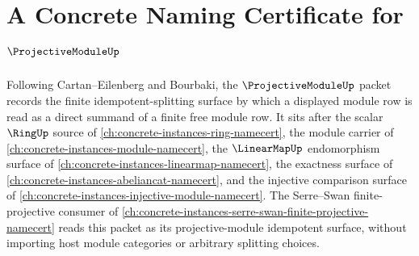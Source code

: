 \chapter{A Concrete Naming Certificate for $\ProjectiveModuleUp$}
\label{ch:concrete-instances-projective-module-namecert}

Following Cartan--Eilenberg and Bourbaki, the $\ProjectiveModuleUp$ packet records the finite idempotent-splitting surface by which a displayed module row is read as a direct summand of a finite free module row. It sits after the scalar $\RingUp$ source of \autoref{ch:concrete-instances-ring-namecert}, the module carrier of \autoref{ch:concrete-instances-module-namecert}, the $\LinearMapUp$ endomorphism surface of \autoref{ch:concrete-instances-linearmap-namecert}, the exactness surface of \autoref{ch:concrete-instances-abeliancat-namecert}, and the injective comparison surface of \autoref{ch:concrete-instances-injective-module-namecert}. The Serre--Swan finite-projective consumer of \autoref{ch:concrete-instances-serre-swan-finite-projective-namecert} reads this packet as its projective-module idempotent surface, without importing host module categories or arbitrary splitting choices.

